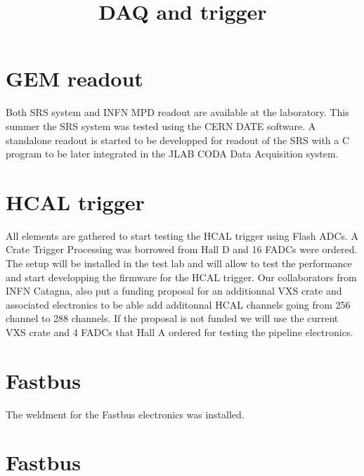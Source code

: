 \documentclass {article}
\title{DAQ and trigger}
\begin{document}
\section{GEM readout}
Both SRS system and INFN MPD readout are available at the laboratory.
This summer the SRS system was tested using the CERN DATE software.
A standalone readout is started to be developped for readout of the SRS with a C program to be later integrated in the JLAB CODA Data Acquisition system.


\section{HCAL trigger}
All elements are gathered to start testing the HCAL trigger using Flash ADCs.
A Crate Trigger Processing was borrowed from Hall D and 16 FADCs were ordered.
The setup will be installed in the test lab and will allow to test the performance and start developping the firmware for the HCAL trigger.
Our collaborators from INFN Catagna, also put a funding proposal for an additionnal VXS crate and associated electronics to be able add additonnal HCAL channels going from 256 channel to 288 channels. If the proposal is not funded we will use the current VXS crate and 4 FADCs that Hall A ordered for testing the pipeline electronics. 


\section {Fastbus}
The weldment for the Fastbus electronics was installed.

\section{Fastbus}
\end{document}
